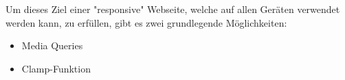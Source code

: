 

Um dieses Ziel einer "responsive" Webseite, welche auf allen Geräten verwendet werden kann, zu erfüllen, gibt es zwei grundlegende Möglichkeiten:

\begin{itemize}
    \item Media Queries
    \item Clamp-Funktion
\end{itemize}



\clearpage
